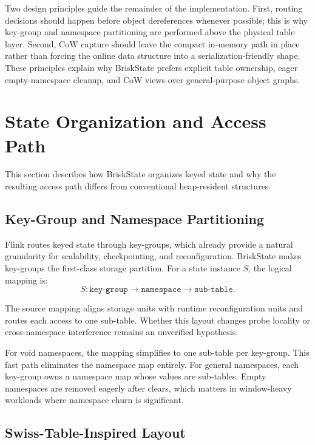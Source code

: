 \documentclass[journal]{IEEEtran}
\newcommand{\briskstate}{BriskState\xspace}
\newcommand{\system}{\briskstate}
\begin{document}
Two design principles guide the remainder of the implementation. First, routing decisions should happen before object dereferences whenever possible; this is why key-group and namespace partitioning are performed above the physical table layer. Second, CoW capture should leave the compact in-memory path in place rather than forcing the online data structure into a serialization-friendly shape. These principles explain why \system prefers explicit table ownership, eager empty-namespace cleanup, and CoW views over general-purpose object graphs.

\section{State Organization and Access Path}

This section describes how \system organizes keyed state and why the resulting access path differs from conventional heap-resident structures.

\subsection{Key-Group and Namespace Partitioning}

Flink routes keyed state through key-groups, which already provide a natural granularity for scalability, checkpointing, and reconfiguration. \system makes key-groups the first-class storage partition. For a state instance $S$, the logical mapping is:
\begin{equation}
S : \texttt{key-group} \rightarrow \texttt{namespace} \rightarrow \texttt{sub-table}.
\end{equation}

The source mapping aligns storage units with runtime reconfiguration units and routes each access to one sub-table. Whether this layout changes probe locality or cross-namespace interference remains an unverified hypothesis.

For void namespaces, the mapping simplifies to one sub-table per key-group. This fast path eliminates the namespace map entirely. For general namespaces, each key-group owns a namespace map whose values are sub-tables. Empty namespaces are removed eagerly after clears, which matters in window-heavy workloads where namespace churn is significant.

\subsection{Swiss-Table-Inspired Layout}
\end{document}
